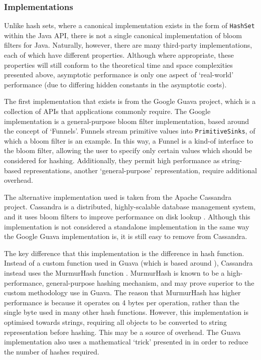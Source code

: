 	\subsubsection{Implementations} \label{sec:runtime/storage/probabilistic/impls}
	Unlike hash sets, where a canonical implementation exists in the form of \texttt{HashSet} within the Java API, there is not a single canonical implementation of bloom filters for Java. Naturally, however, there are many third-party implementations, each of which have different properties. Although where appropriate, these properties will still conform to the theoretical time and space complexities presented above, asymptotic performance is only one aspect of `real-world' performance (due to differing hidden constants in the asymptotic costs).
	
	The first implementation that exists is from the Google Guava project, which is a collection of APIs that applications commonly require. The Google implementation is a general-purpose bloom filter implementation, based around the concept of `Funnels'. Funnels stream primitive values into \texttt{PrimitiveSinks}, of which a bloom filter is an example. In this way, a Funnel is a kind-of interface to the bloom filter, allowing the user to specify only certain values which should be considered for hashing. Additionally, they permit high performance as string-based representations, another `general-purpose' representation, require additional overhead.
	
	The alternative implementation used is taken from the Apache Cassandra project. Cassandra is a distributed, highly-scalable database management system, and it uses bloom filters to improve performance on disk lookup \citep{CassandraArch}. Although this implementation is not considered a standalone implementation in the same way the Google Guava implementation is, it is still easy to remove from Cassandra.
	
	The key difference that this implementation is the difference in hash function. Instead of a custom function used in Guava (which is based around \citet{Swamidass2007}), Cassandra instead uses the MurmurHash function \citep{MurmurHash}. MurmurHash is known to be a high-performance, general-purpose hashing mechanism, and may prove superior to the custom methodology use in Guava. The reason that MurmurHash has higher performance is because it operates on 4 bytes per operation, rather than the single byte used in many other hash functions. However, this implementation is optimised towards strings, requiring all objects to be converted to string representation before hashing. This may be a source of overhead. The Guava implementation also uses a mathematical `trick' presented in \citet{Kirsch2006} in order to reduce the number of hashes required.
	
